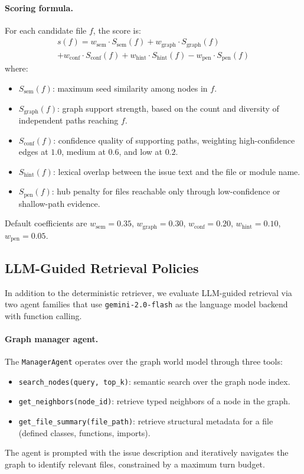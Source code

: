 \paragraph{Scoring formula.}
For each candidate file $f$, the score is:
\begin{multline}
\label{eq:deterministic_score}
s(f) = w_{\text{sem}} \cdot S_{\text{sem}}(f) + w_{\text{graph}} \cdot S_{\text{graph}}(f) \\
  + w_{\text{conf}} \cdot S_{\text{conf}}(f) + w_{\text{hint}} \cdot S_{\text{hint}}(f) - w_{\text{pen}} \cdot S_{\text{pen}}(f)
\end{multline}
where:
\begin{itemize}[leftmargin=1.5em]
  \item $S_{\text{sem}}(f)$: maximum seed similarity among nodes in $f$.
  \item $S_{\text{graph}}(f)$: graph support strength, based on the count and diversity of independent paths reaching $f$.
  \item $S_{\text{conf}}(f)$: confidence quality of supporting paths, weighting high-confidence edges at $1.0$, medium at $0.6$, and low at $0.2$.
  \item $S_{\text{hint}}(f)$: lexical overlap between the issue text and the file or module name.
  \item $S_{\text{pen}}(f)$: hub penalty for files reachable only through low-confidence or shallow-path evidence.
\end{itemize}
Default coefficients are $w_{\text{sem}} = 0.35$, $w_{\text{graph}} = 0.30$, $w_{\text{conf}} = 0.20$, $w_{\text{hint}} = 0.10$, $w_{\text{pen}} = 0.05$.

\subsection{LLM-Guided Retrieval Policies}
\label{sec:llm_guided_retrieval}

In addition to the deterministic retriever, we evaluate LLM-guided retrieval via two agent families that use \texttt{gemini-2.0-flash} \citep{gemini2024} as the language model backend with function calling.

\paragraph{Graph manager agent.}
The \texttt{ManagerAgent} operates over the graph world model through three tools:
\begin{itemize}[leftmargin=1.5em]
  \item \texttt{search\_nodes(query, top\_k)}: semantic search over the graph node index.
  \item \texttt{get\_neighbors(node\_id)}: retrieve typed neighbors of a node in the graph.
  \item \texttt{get\_file\_summary(file\_path)}: retrieve structural metadata for a file (defined classes, functions, imports).
\end{itemize}
The agent is prompted with the issue description and iteratively navigates the graph to identify relevant files, constrained by a maximum turn budget.

